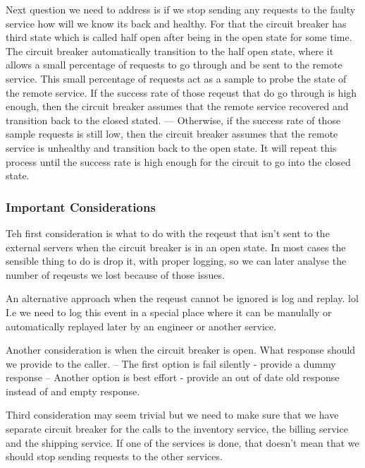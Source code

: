 Next question we need to address is if we stop sending any requests to the faulty service how will we know its back and healthy.
For that the circuit breaker has third state which is called half open after being in the open state for some time.
The circuit breaker automatically transition to the half open state, where it allows a small percentage of requests to go through and be sent to the remote service.
This small percentage of requests act as a sample to probe the state of the remote service.
If the success rate of those reqeust that do go through is high enough, then the circuit breaker assumes that the remote service recovered and transition back to the closed stated.
--- Otherwise, if the success rate of those sample requests is still low, then the circuit breaker assumes that the remote service is unhealthy and transition back to the open state.
It will repeat this process until the success rate is high enough for the circuit to go into the closed state.

\subsubsection{Important Considerations}
Teh first consideration is what to do with the reqeust that isn't sent to the external servers when the circuit breaker is in an open state.
In most cases the sensible thing to do is drop it, with proper logging, so we can later analyse the number of reqeusts we lost because of those issues.

An alternative approach when the reqeust cannot be ignored is log and replay. lol
I.e we need to log this event in a special place where it can be manulally or automatically replayed later by an engineer or another service.

Another consideration is when the circuit breaker is open.
What response should we provide to the caller.
-- The first option is fail silently - provide a dummy response
-- Another option is best effort - provide an out of date old response instead of and empty response.

Third consideration may seem trivial but we need to make sure that we have separate circuit breaker for the calls to the inventory service, the billing service and the shipping service.
If one of the services is done, that doesn't mean that we should stop sending requests to the other services.

